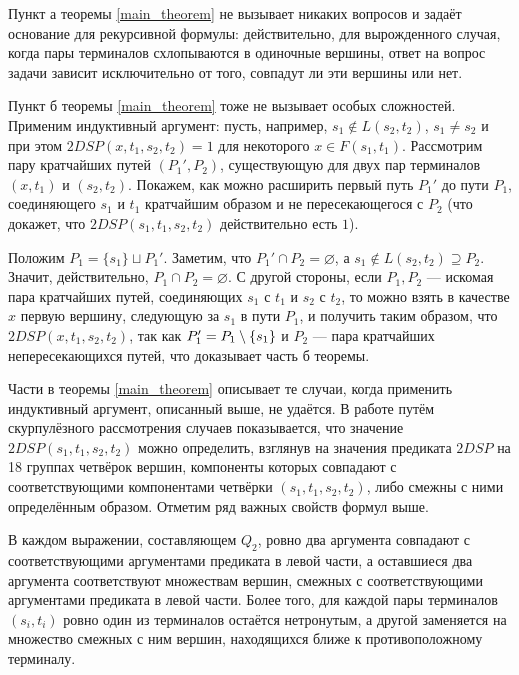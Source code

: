 Пункт а теоремы \ref{main_theorem} не вызывает никаких вопросов и задаёт основание для рекурсивной формулы: действительно, для вырожденного случая, когда пары терминалов схлопываются в одиночные вершины, ответ на вопрос задачи зависит исключительно от того, совпадут ли эти вершины или нет.

Пункт б теоремы \ref{main_theorem} тоже не вызывает особых сложностей. Применим индуктивный аргумент: пусть, например, $s_1 \notin L(s_2, t_2)$, $s_1 \neq s_2$ и при этом $2DSP(x, t_1, s_2, t_2) = 1$ для некоторого $x \in F(s_1, t_1)$. Рассмотрим пару кратчайших путей $(P_1', P_2)$, существующую для двух пар терминалов $(x, t_1)$ и $(s_2, t_2)$. Покажем, как можно расширить первый путь $P_1'$ до пути $P_1$, соединяющего $s_1$ и $t_1$ кратчайшим образом и не пересекающегося с $P_2$ (что докажет, что $2DSP(s_1, t_1, s_2, t_2)$ действительно есть $1$).

Положим $P_1 = \{s_1\} \sqcup P_1'$. Заметим, что $P_1' \cap P_2 = \varnothing$, а $s_1 \notin L(s_2, t_2) \supseteq P_2$. Значит, действительно, $P_1 \cap P_2 = \varnothing$. С другой стороны, если $P_1, P_2$ --- искомая пара кратчайших путей, соединяющих $s_1$ с $t_1$ и $s_2$ с $t_2$, то можно взять в качестве $x$ первую вершину, следующую за $s_1$ в пути $P_1$, и получить таким образом, что $2DSP(x, t_1, s_2, t_2)$, так как $P_1' = P_1 \setminus \{s_1\}$ и $P_2$ --- пара кратчайших непересекающихся путей, что доказывает часть б теоремы.

Части в теоремы \ref{main_theorem} описывает те случаи, когда применить индуктивный аргумент, описанный выше, не удаётся. В работе \cite{ET} путём скурпулёзного рассмотрения случаев показывается, что значение $2DSP(s_1, t_1, s_2, t_2)$ можно определить, взглянув на значения предиката $2DSP$ на 18 группах четвёрок вершин, компоненты которых совпадают с соответствующими компонентами четвёрки $(s_1, t_1, s_2, t_2)$, либо смежны с ними определённым образом. Отметим ряд важных свойств формул выше.

\begin{proposition} \label{q2_structure}
В каждом выражении, составляющем $Q_2$, ровно два аргумента совпадают с соответствующими аргументами предиката в левой части, а оставшиеся два аргумента соответствуют множествам вершин, смежных с соответствующими аргументами предиката в левой части. Более того, для каждой пары терминалов $(s_i, t_i)$ ровно один из терминалов остаётся нетронутым, а другой заменяется на множество смежных с ним вершин, находящихся ближе к противоположному терминалу.
\end{proposition}

